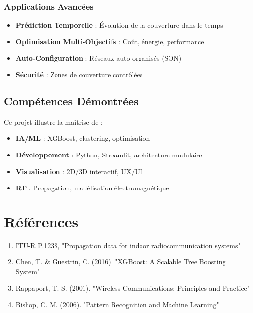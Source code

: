 \documentclass[12pt,a4paper]{article}
\begin{document}
\subsubsection{Applications Avancées}

\begin{itemize}
    \item \textbf{Prédiction Temporelle} : Évolution de la couverture dans le temps
    \item \textbf{Optimisation Multi-Objectifs} : Coût, énergie, performance
    \item \textbf{Auto-Configuration} : Réseaux auto-organisés (SON)
    \item \textbf{Sécurité} : Zones de couverture contrôlées
\end{itemize}

\subsection{Compétences Démontrées}

Ce projet illustre la maîtrise de :
\begin{itemize}
    \item \textbf{IA/ML} : XGBoost, clustering, optimisation
    \item \textbf{Développement} : Python, Streamlit, architecture modulaire
    \item \textbf{Visualisation} : 2D/3D interactif, UX/UI
    \item \textbf{RF} : Propagation, modélisation électromagnétique
\end{itemize}

\section*{Références}

\begin{enumerate}
    \item ITU-R P.1238, "Propagation data for indoor radiocommunication systems"
    \item Chen, T. \& Guestrin, C. (2016). "XGBoost: A Scalable Tree Boosting System"
    \item Rappaport, T. S. (2001). "Wireless Communications: Principles and Practice"
    \item Bishop, C. M. (2006). "Pattern Recognition and Machine Learning"
\end{enumerate}

\appendix
\end{document}
